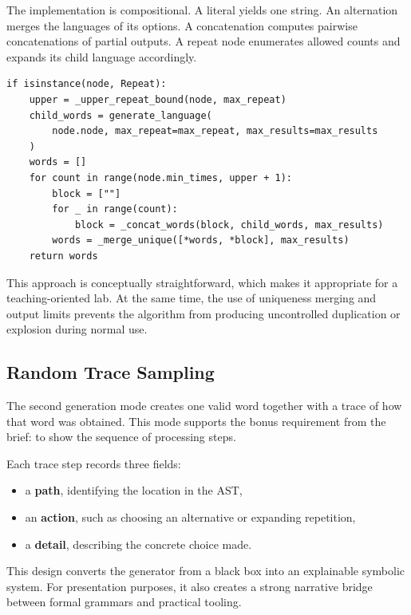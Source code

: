 \documentclass[a4paper,12pt]{article}
\begin{document}
The implementation is compositional. A literal yields one string. An alternation merges the languages of its options. A concatenation computes pairwise concatenations of partial outputs. A repeat node enumerates allowed counts and expands its child language accordingly.

\begin{lstlisting}[style=labpython,caption={Core idea of deterministic generation for repetition nodes.}]
if isinstance(node, Repeat):
    upper = _upper_repeat_bound(node, max_repeat)
    child_words = generate_language(
        node.node, max_repeat=max_repeat, max_results=max_results
    )
    words = []
    for count in range(node.min_times, upper + 1):
        block = [""]
        for _ in range(count):
            block = _concat_words(block, child_words, max_results)
        words = _merge_unique([*words, *block], max_results)
    return words
\end{lstlisting}

This approach is conceptually straightforward, which makes it appropriate for a teaching-oriented lab. At the same time, the use of uniqueness merging and output limits prevents the algorithm from producing uncontrolled duplication or explosion during normal use.

\subsection{Random Trace Sampling}

The second generation mode creates one valid word together with a trace of how that word was obtained. This mode supports the bonus requirement from the brief: to show the sequence of processing steps.

Each trace step records three fields:

\begin{itemize}
    \item a \textbf{path}, identifying the location in the AST,
    \item an \textbf{action}, such as choosing an alternative or expanding repetition,
    \item a \textbf{detail}, describing the concrete choice made.
\end{itemize}

This design converts the generator from a black box into an explainable symbolic system. For presentation purposes, it also creates a strong narrative bridge between formal grammars and practical tooling.
\end{document}
